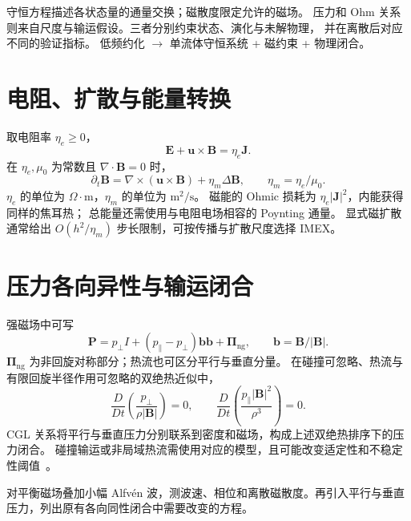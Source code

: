 {守恒方程描述各状态量的通量交换；磁散度限定允许的磁场。
压力和 Ohm 关系则来自尺度与输运假设。三者分别约束状态、演化与未解物理，
并在离散后对应不同的验证指标。}
{低频约化 $\longrightarrow$ 单流体守恒系统 + 磁约束 + 物理闭合。}

\section{电阻、扩散与能量转换}
取电阻率 $\eta_e\ge0$，
\[
\bm E+\bm u\times\bm B=\eta_e\bm J.
\]
在 $\eta_e,\mu_0$ 为常数且 $\nabla\cdot\bm B=0$ 时，
\[
\partial_t\bm B=\nabla\times(\bm u\times\bm B)
+\eta_m\Delta\bm B,\qquad \eta_m=\eta_e/\mu_0.
\]
$\eta_e$ 的单位为 $\Omega\cdot\mathrm m$，$\eta_m$ 的单位为 $\mathrm m^2/\mathrm s$。
磁能的 Ohmic 损耗为 $\eta_e|\bm J|^2$，内能获得同样的焦耳热；
总能量还需使用与电阻电场相容的 Poynting 通量。
显式磁扩散通常给出 $O(h^2/\eta_m)$ 步长限制，可按传播与扩散尺度选择 IMEX。

\section{压力各向异性与输运闭合}
强磁场中可写
\[
\bm P=p_\perp I+(p_\parallel-p_\perp)\bm b\bm b+\bm\Pi_{\mathrm{ng}},
\qquad \bm b=\bm B/|\bm B|.
\]
$\bm\Pi_{\mathrm{ng}}$ 为非回旋对称部分；热流也可区分平行与垂直分量。
在碰撞可忽略、热流与有限回旋半径作用可忽略的双绝热近似中，
\[
\frac{D}{Dt}\left(\frac{p_\perp}{\rho|\bm B|}\right)=0,\qquad
\frac{D}{Dt}\left(\frac{p_\parallel|\bm B|^2}{\rho^3}\right)=0.
\]
CGL 关系将平行与垂直压力分别联系到密度和磁场，构成上述双绝热排序下的压力闭合。
碰撞输运或非局域热流需使用对应的模型，且可能改变适定性和不稳定性阈值~\cite{cgl1956}。

{对平衡磁场叠加小幅 Alfv\'en 波，测波速、相位和离散磁散度。再引入平行与垂直压力，列出原有各向同性闭合中需要改变的方程。}
